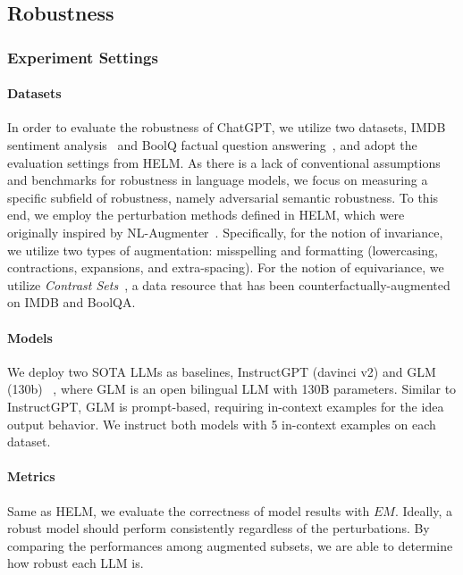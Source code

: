 \subsection{Robustness}

\subsubsection{\textbf{Experiment Settings}}

\paragraph{Datasets} In order to evaluate the robustness of ChatGPT, we utilize two datasets, IMDB sentiment analysis~\cite{maas2011learning} and BoolQ factual question answering~\cite{clark2019boolq}, and adopt the evaluation settings from HELM. As there is a lack of conventional assumptions and benchmarks for robustness in language models, we focus on measuring a specific subfield of robustness, namely adversarial semantic robustness. To this end, we employ the perturbation methods defined in HELM, which were originally inspired by NL-Augmenter~\cite{dhole2021nl}. Specifically, for the notion of invariance, we utilize two types of augmentation: misspelling and formatting (lowercasing, contractions, expansions, and extra-spacing). For the notion of equivariance, we utilize \textit{Contrast Sets}~\cite{gardner2020evaluating}, a data resource that has been counterfactually-augmented on IMDB and BoolQA.

\paragraph{Models} We deploy two SOTA LLMs as baselines, InstructGPT (davinci v2) and GLM (130b) ~\cite{zeng2022glm}, where GLM is an open bilingual LLM with 130B parameters. Similar to InstructGPT, GLM is prompt-based, requiring in-context examples for the idea output behavior. We instruct both models with 5 in-context examples on each dataset.

\paragraph{Metrics} Same as HELM, we evaluate the correctness of model results with $EM$. Ideally, a robust model should perform consistently regardless of the perturbations. By comparing the performances among augmented subsets, we are able to determine how robust each LLM is.

